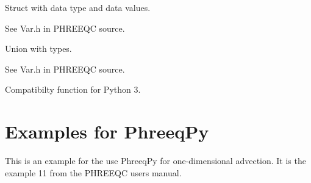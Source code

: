 \documentclass[letterpaper,10pt,english]{sphinxmanual}
\begin{document}
\begin{fulllineitems}
\label{iphreeqc:phreeqpy.iphreeqc.phreeqc_dll.VAR}
Struct with data type and data values.

See Var.h in PHREEQC source.

\end{fulllineitems}


\begin{fulllineitems}
\label{iphreeqc:phreeqpy.iphreeqc.phreeqc_dll.VARUNION}
Union with types.

See Var.h in PHREEQC source.

\end{fulllineitems}


\begin{fulllineitems}
\label{iphreeqc:phreeqpy.iphreeqc.phreeqc_dll.bytes}
Compatibilty function for Python 3.

\end{fulllineitems}



\chapter{Examples for PhreeqPy}
\label{examples:examples-for-phreeqpy}\label{examples::doc}
This is an example for the use PhreeqPy for one-dimensional advection.
It is the example 11 from the PHREEQC users manual.
\end{document}
